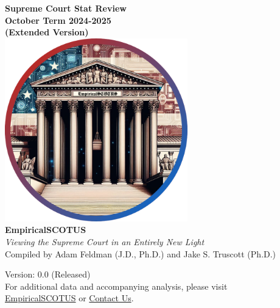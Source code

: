 
\thispagestyle{empty}
\begin{center}
  \Huge \textbf{Supreme Court Stat Review} \\
  \LARGE \textbf{October Term 2024-2025} \\
  \Large \textbf{(Extended Version)} \\ [7mm]
  \includegraphics[width=300px]{images/empirical_scotus_logo.png}\\[2mm]
  \textbf{EmpiricalSCOTUS} \\
  \textit{Viewing the Supreme Court in an Entirely New Light} \\[3mm]

  \normalsize
  Compiled by Adam Feldman (J.D., Ph.D.) and Jake S. Truscott (Ph.D.) \\
  \vfill

  \footnotesize
  Version: 0.0 (Released) \\[2mm]

  \normalsize
 For additional data and accompanying analysis, please visit\\ \textcolor{blue}{\href{https://empiricalscotus.com/}{EmpiricalSCOTUS}} or \textcolor{blue}{\href{mailto:adam@feldmannet.com}{Contact Us}}.
\end{center}
